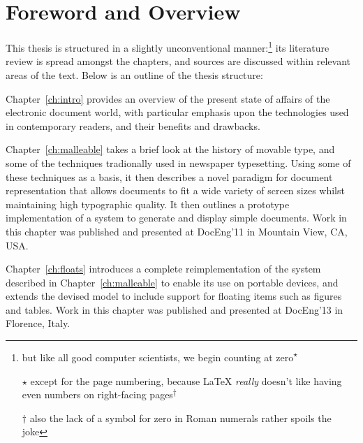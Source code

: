 \cleardoublepage
\chapter{Foreword and Overview}
\setcounter{footnote}{-1}
This thesis is structured in a slightly unconventional manner:\footnote{but like all good computer scientists, we begin counting at zero\textsuperscript{$\star$}

 \vspace{0.8em}
\noindent \scriptsize{$\star$ except for the page numbering, because \LaTeX{} \emph{really} doesn't like having even numbers on right-facing pages\textsuperscript{$\dagger$}}

\vspace{0.8em} 
\noindent \tiny{$\dagger$ also the lack of a symbol for zero in Roman numerals rather spoils the joke}} its literature review is spread amongst the chapters, and sources are discussed within relevant areas of the text. Below is an outline of the thesis structure:

\vspace{1em}
\noindent Chapter~\ref{ch:intro} provides an overview of the present state of affairs of the electronic document world, with particular emphasis upon the technologies used in contemporary \ebook{} readers, and their benefits and drawbacks.

\vspace{1em}
\noindent Chapter~\ref{ch:malleable} takes a brief look at the history of movable type, and some of the techniques tradionally used in newspaper typesetting. Using some of these techniques as a basis, it then describes a novel paradigm for document representation that allows documents to fit a wide variety of screen sizes whilst maintaining high typographic quality. It then outlines a prototype implementation of a system to generate and display simple documents. Work in this chapter was published and presented at DocEng'11 in Mountain View, CA, USA.\hspace{0pt}\cite{Pinkney2011}

\vspace{1em}
\noindent Chapter~\ref{ch:floats} introduces a complete reimplementation of the system described in Chapter~\ref{ch:malleable} to enable its use on portable devices, and extends the devised model to include support for floating items such as figures and tables. Work in this chapter was published and presented at DocEng'13 in Florence, Italy.\hspace{0pt}\cite{Pinkney2013}

